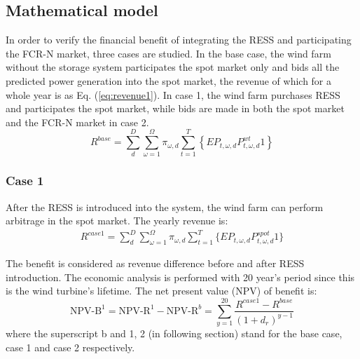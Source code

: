 \documentclass[final,5p,times,twocolumn,authoryear]{elsarticle}
\begin{document}
\subsection{Mathematical model}

In order to verify the financial benefit of integrating the RESS and participating the FCR-N market, three cases are studied. In the base case, the wind farm without the storage system participates the spot market only and bids all the predicted power generation into the spot market, the revenue of which for a whole year is as Eq. (\ref{eq:revenue1}). In case 1, the wind farm purchases RESS and participates the spot market, while bids are made in both the spot market and the FCR-N market in case 2.
\begin{equation} \label{eq:revenue1}
R^{base} =\sum_{d}^D \sum_{\omega =1}^{\Omega}\pi_{\omega,d}\sum_{t = 1}^T \left\{EP_{t,\omega,d}P_{t,\omega,d}^{wt}1 \right\}
\end{equation}
\subsubsection{Case 1}
After the RESS is introduced into the system, the wind farm can perform arbitrage in the spot market. The yearly revenue is:
\begin{equation} \label{eq:revenue2}
\begin{split}
R^{case1} =\sum_{d}^D \sum_{\omega =1}^{\Omega}\pi_{\omega,d}\sum_{t = 1}^T \{ EP_{t,\omega,d}P_{t,\omega,d}^{spot}1  \}
\end{split}
\end{equation}

The benefit is considered as revenue difference before and after RESS introduction. The economic analysis is performed with 20 year's period since this is the wind turbine's lifetime. The net present value (NPV) of benefit is:
\begin{equation} \label{eq:benefit}
\text{NPV-B}^1 =\text{NPV-R}^1 - \text{NPV-R}^b = \sum_{y = 1}^{20} \frac {R^{case1} - R^{base}} {(1+d_r)^{y-1}}
\end{equation}
where the superscript b and 1, 2 (in following section) stand for the base case, case 1 and case 2 respectively. 
\end{document}
